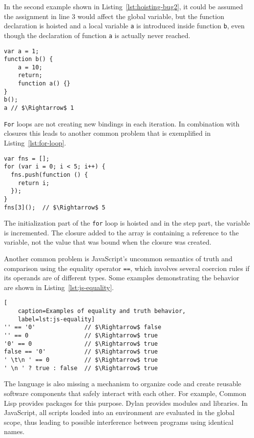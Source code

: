 \documentclass{acm_proc_article-sp}
\begin{document}
In the second example shown in Listing~\ref{lst:hoisting-bug2}, it
could be assumed the assignment in line 3 would affect the global
variable, but the function declaration is hoisted and a local variable
\texttt{a} is introduced inside function \texttt{b}, even though the
declaration of function \texttt{a} is actually never reached.

\begin{lstlisting}[caption=Hoisting with unreachable code,label=lst:hoisting-bug2]
var a = 1;
function b() {
    a = 10;
    return;
    function a() {}
}
b();
a // $\Rightarrow$ 1
\end{lstlisting}

\texttt{For} loops are not creating new bindings in each iteration.
In combination with closures this leads to another common problem that
is exemplified in Listing~\ref{lst:for-loop}.

\begin{lstlisting}[caption=For loop in connection with closure,label=lst:for-loop]
var fns = [];
for (var i = 0; i < 5; i++) {
  fns.push(function () {
    return i;
  });
}
fns[3]();  // $\Rightarrow$ 5
\end{lstlisting}

The initialization part of the \texttt{for} loop is hoisted and in the
step part, the variable is incremented. The closure added to the array
is containing a reference to the variable, not the value that was
bound when the closure was created.

Another common problem is JavaScript's uncommon semantics of truth and
comparison using the equality operator \texttt{==}, which involves
several coercion rules if its operands are of different types. Some
examples demonstrating the behavior are shown in
Listing~\ref{lst:js-equality}.

\begin{lstlisting}[
    caption=Examples of equality and truth behavior,
    label=lst:js-equality]
'' == '0'              // $\Rightarrow$ false
'' == 0                // $\Rightarrow$ true
'0' == 0               // $\Rightarrow$ true
false == '0'           // $\Rightarrow$ true
' \t\n ' == 0          // $\Rightarrow$ true
' \n ' ? true : false  // $\Rightarrow$ true
\end{lstlisting}

The language is also missing a mechanism to organize code and create
reusable software components that safely interact with each other. For
example, Common Lisp provides packages for this purpose. Dylan
provides modules and libraries. In JavaScript, all scripts loaded into
an environment are evaluated in the global scope, thus leading to
possible interference between programs using identical names.
\end{document}

